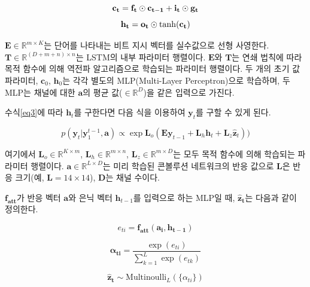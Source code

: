 \documentclass{kcc}
\newcommand{\vy}[0]{\mathbf{y}}
\newcommand{\va}[0]{\mathbf{a}}
\newcommand{\vh}[0]{\mathbf{h}}
\newcommand{\vz}[0]{\mathbf{z}}
\newcommand{\mE}[0]{\mathbf{E}}
\newcommand{\mL}[0]{\mathbf{L}}
\newcommand{\mT}[0]{\mathbf{T}}
\newcommand{\sa}[0]{\mathbf{a}}
\begin{document}
\begin{equation}
\mathbf{c_t} = \mathbf{f_t} \odot \mathbf{c_{t-1}} + \mathbf{i_t} \odot \mathbf{g_t}\\
\end{equation}
\begin{equation}
\label{eq3}
\mathbf{h_t} = \mathbf{o_t} \odot \tanh(\mathbf{c_t})\\
\end{equation}

$\mE \in \mathbb{R}^{m \times K}$는 단어를 나타내는 비트 지시 벡터를 실수값으로 선형 사영한다.  $\mT \in \mathbb{R}^{(D+m+n) \times n}$는 LSTM의 내부 파라미터 행렬이다. $\mE$와 $\mT$는 연쇄 법칙에 따라 목적 함수에 의해 역전파 알고리즘으로 학습되는 파라미터 행렬이다. 두 개의 초기 값 파라미터, $\mathbf{c}_0$, $\mathbf{h}_0$는 각각 별도의 MLP(Multi-Layer Perceptron)으로 학습하며, 두 MLP는 채널에 대한 $\mathbf{a}$의 평균 값($\in \mathbb{R}^{D}$)을 같은 입력으로 가진다.

수식\ref{eq3}에 따라 $\vh_t$를 구한다면 다음 식을 이용하여 $\vy_t$를 구할 수 있게 된다.

\begin{equation}
p(\vy_t|\vy^{t-1}_1,\sa) \propto \exp{\mL_o(\mE\vy_{t-1} + \mL_{h}\vh_t + \mL_{z}\hat{\vz}_t))}
\end{equation}

여기에서 $\mathbf{L}_{o} \in \mathbb{R}^{K \times m}$, $\mathbf{L}_{h} \in \mathbb{R}^{m \times n}$, $\mathbf{L}_{z} \in \mathbb{R}^{m \times D}$는 모두 목적 함수에 의해 학습되는 파라미터 행렬이다. $\mathbf{a} \in \mathbb{R}^{L \times D}$는 미리 학습된 콘볼루션 네트워크의 반응 값으로 $\mathbf{L}$은 반응 크기(예, $\mathbf{L} = 14 \times 14$), $\mathbf{D}$는 채널 수이다. 

$\mathbf{f_{\text{att}}}$가 반응 벡터 $\va$와 은닉 벡터 $\vh_{t-1}$를 입력으로 하는  MLP일 때, $\mathbf{\hat{z}_t}$는 다음과 같이 정의한다.

\begin{equation}
e_{ti} = \mathbf{f_{\text{att}}}(\mathbf{a_i}, \mathbf{h_{t-1}})
\end{equation}

\begin{equation}
\mathbf{\alpha_{ti}} = \frac{\exp(e_{ti})}{\sum^{L}_{k=1}\exp(e_{tk})}
\end{equation}

\begin{equation}
\mathbf{\hat{z}_t} \sim \text{Multinoulli}_L(\{\alpha_{ti}\})
\end{equation}
\end{document}
